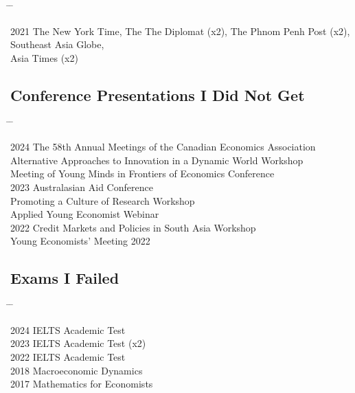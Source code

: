\documentclass[10pt,a4paper]{article}
\newcommand{\tabbedblock}[1]{

	\begin{tabbing}
		\hspace{2cm} \= \hspace{4cm} \= \kill
		#1
	\end{tabbing}
}
\begin{document}
\tabbedblock{
	2021 \> The New York Time, The The Diplomat (x2), The Phnom Penh Post (x2), Southeast Asia Globe, \\
	\> Asia Times (x2) 
	
}
\subsection*{Conference Presentations I Did Not Get}

\tabbedblock{
	2024 \> The 58th Annual Meetings of the Canadian Economics Association \\
			\> Alternative Approaches to Innovation in a Dynamic World Workshop \\
			\> Meeting of Young Minds in Frontiers of Economics Conference \\
	
	2023 \> 2023 Australasian Aid Conference \\
			\> Promoting a Culture of Research Workshop \\
			\> Applied Young Economist Webinar \\
	2022 \> Credit Markets and Policies in South Asia Workshop \\
			\> Young Economists' Meeting 2022
}


\subsection*{Exams I Failed}

\tabbedblock{
	2024 \> IELTS Academic Test\\
	2023 \> IELTS Academic Test (x2) \\
	2022 \> IELTS Academic Test \\
	2018 \> Macroeconomic Dynamics \\
	2017 \> Mathematics for Economists
}


\end{document}
